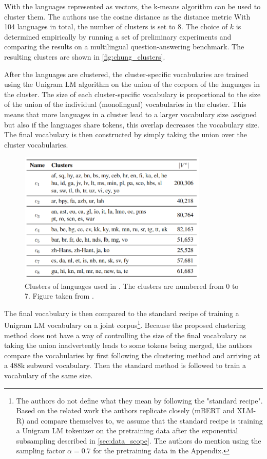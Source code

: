With the languages represented as vectors, the k-means algorithm can be used to cluster them. The authors use the cosine distance as the distance metric 
With 104 languages in total, the number of clusters is set to 8. The choice of $k$ is determined empirically by running a set of preliminary experiments and comparing the results on a multilingual question-answering benchmark. The resulting clusters are shown in \autoref{fig:chung_clusters}.

After the languages are clustered, the cluster-specific vocabularies are trained using the Unigram LM algorithm on the union of the corpora of the languages in the cluster. The size of each cluster-specific vocabulary is proportional to the size of the union of the individual (monolingual) vocabularies in the cluster. This means that more languages in a cluster lead to a larger vocabulary size assigned but also if the languages share tokens, this overlap decreases the vocabulary size. The final vocabulary is then constructed by simply taking the union over the cluster vocabularies.

\begin{figure}[ht]
    \centering
    \includegraphics[width=0.8\textwidth]{img/temp/chung_clusters.png}
    \caption{Clusters of languages used in \cite{chung_improving_2020}. The clusters are numbered from 0 to 7. Figure taken from \cite{chung_improving_2020}.}
    \label{fig:chung_clusters}
\end{figure}

The final vocabulary is then compared to the standard recipe of training a Unigram LM vocabulary on a joint corpus\footnote{The authors do not define what they mean by following the "standard recipe". Based on the related work the authors replicate closely (mBERT and XLM-R) and compare themselves to, we assume that the standard recipe is training a Unigram LM tokenizer on the pretraining data after the exponential subsampling described in \ref{sec:data_scope}. The authors do mention using the sampling factor $\alpha=0.7$ for the pretraining data in the Appendix.}. Because the proposed clustering method does not have a way of controlling the size of the final vocabulary as taking the union inadvertently leads to some tokens being merged, the authors compare the vocabularies by first following the clustering method and arriving at a 488k subword vocabulary. Then the standard method is followed to train a vocabulary of the same size.

